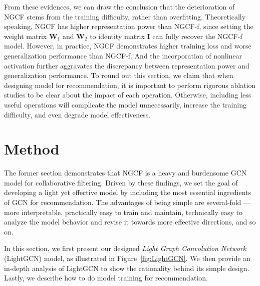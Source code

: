 \documentclass[sigconf]{acmart}
\theoremstyle{definition}
\begin{document}
From these evidences, we can draw the conclusion that the deterioration of NGCF stems from the training difficulty, rather than overfitting. 
Theoretically speaking, NGCF has higher representation power than NGCF-f, since setting the weight matrix $\textbf{W}_1$ and $\textbf{W}_2$ to identity matrix $\textbf{I}$ can fully recover the NGCF-f model. However, in practice, NGCF demonstrates higher training loss and worse generalization performance than NGCF-f. 
And the incorporation of nonlinear activation further aggravates the discrepancy between representation power and generalization performance. To round out this section, we claim that when designing model for recommendation, it is important to perform rigorous ablation studies to be clear about the impact of each operation. Otherwise, including less useful operations will complicate the model unnecessarily, increase the training difficulty, and even degrade model effectiveness.  \section{Method}\label{sec:method}
The former section demonstrates that NGCF is a heavy and burdensome GCN model for  collaborative filtering.
Driven by these findings, we set the goal of developing a light yet effective model by including the most essential ingredients of GCN for recommendation. 
The advantages of being simple are several-fold --- more interpretable, practically easy to train and maintain, technically easy to analyze the model behavior and revise it towards more effective directions, and so on. 

In this section, we first present our designed \textit{Light Graph Convolution Network} (LightGCN) model, as illustrated in Figure~\ref{fig:LightGCN}.
We then provide an in-depth analysis of LightGCN to show the rationality behind its simple design. 
Lastly, we describe how to do model training for recommendation. 
\end{document}
